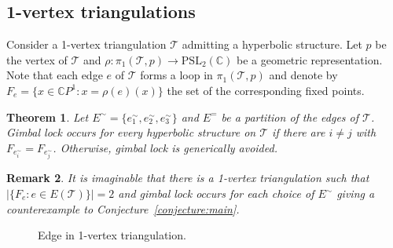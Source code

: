 \documentclass[utopia,fullpage]{nmd/article}
\newcommand{\negSpace}{\!}
\newcommand\C{\mathbb C}
\newtheorem{theorem}{Theorem}[section]
\newtheorem{remark}[theorem]{Remark}
\newcommand{\negSpace}{}
\newcommand\myPSL[2]{\mathrm{PSL}_{#1}(#2)}
\newcommand\trig{\mathcal{T}}
\begin{document}
\subsection{1-vertex triangulations} \label{sec:singleVertexTrigs} Consider a 1-vertex triangulation $\trig$ admitting a hyperbolic structure. Let $p$ be the vertex of $\trig$ and $\rho:\pi_1(\trig\negSpace{}, p)\to\myPSL{2}{\C}$ be a geometric representation. Note that each edge $e$ of $\trig$ forms a loop in $\pi_1(\trig\negSpace{}, p)$ and denote by $F_e=\{x\in \C P^1 : x = \rho(e)(x)\}$ the set of the corresponding fixed points.
\begin{theorem} \label{thm:singleVertexTriangulationGimbalLockCondition}
Let $E^\sim = \{e^\sim_1, e^\sim_2, e^\sim_3\}$ and $E^=$ be a partition of the edges of $\trig\negSpace{}$. Gimbal lock occurs for every hyperbolic structure on $\trig$ if there are $i\not= j$ with $F_{e^\sim_i}=F_{e^\sim_j}$. Otherwise, gimbal lock is generically avoided.
\end{theorem}

\begin{remark}
It is imaginable that there is a 1-vertex triangulation such that $|\{F_e : e\in E(\trig)\}|=2$ and gimbal lock occurs for each choice of $E^\sim$ giving a counterexample to Conjecture~\ref{conjecture:main}. 
\end{remark}

\begin{figure}[h]
\begin{center}
\scalebox{0.5}{
}
\end{center}
\caption{Edge in 1-vertex triangulation.\label{fig:edgeSingVertTrig}}
\end{figure}
\end{document}
